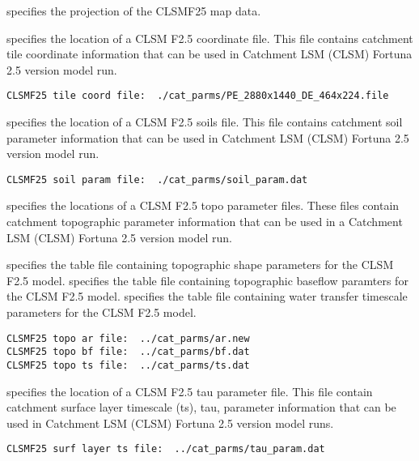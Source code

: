  
  specifies the projection of the
 CLSMF25 map data.
 

 
  specifies the location of a CLSM F2.5
 coordinate file.  This file contains catchment tile coordinate
 information that can be used in
 Catchment LSM (CLSM) Fortuna 2.5 version model run.
 

 \begin{Verbatim}[frame=single]
CLSMF25 tile coord file:  ./cat_parms/PE_2880x1440_DE_464x224.file
 \end{Verbatim}

 
  specifies the location of a
 CLSM F2.5 soils file.  This file contains catchment soil parameter
 information that can be used in Catchment LSM (CLSM) Fortuna 2.5
 version model run.
 

 \begin{Verbatim}[frame=single]
CLSMF25 soil param file:  ./cat_parms/soil_param.dat
 \end{Verbatim}

 
  specifies the locations of a CLSM F2.5
 topo parameter files.  These files contain catchment topographic
 parameter information that can be used in a Catchment LSM (CLSM)
 Fortuna 2.5 version model run.

  specifies the table file containing 
   topographic shape parameters for the CLSM F2.5 model.
  specifies the table file containing
   topographic baseflow paramters for the CLSM F2.5 model.
  specifies the table file containing
   water transfer timescale parameters for the CLSM F2.5 model.

 

 \begin{Verbatim}[frame=single]
CLSMF25 topo ar file:  ../cat_parms/ar.new
CLSMF25 topo bf file:  ../cat_parms/bf.dat
CLSMF25 topo ts file:  ../cat_parms/ts.dat
 \end{Verbatim}

 
  specifies the location of a
 CLSM F2.5 tau parameter file.  This file contain catchment surface
 layer timescale (ts), tau, parameter information that can be used
 in Catchment LSM (CLSM) Fortuna 2.5 version model runs.
 

 \begin{Verbatim}[frame=single]
CLSMF25 surf layer ts file:  ../cat_parms/tau_param.dat
 \end{Verbatim}

